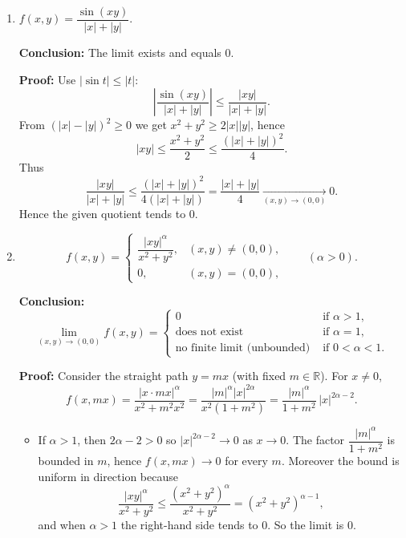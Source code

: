 \documentclass[12pt]{article}
\begin{document}
\begin{correctionbox}
\begin{enumerate}
\textbf{Conclusion:} The limit exists and equals \(0\).

\textbf{Proof:} Let \(R=\sqrt{x^2+y^2}\). Then \(|x|\le R\) and \(|y|\le R\). Also \(|xy|\le\tfrac{x^2+y^2}{2}=\tfrac{R^2}{2}\). Hence
\[
|2x^2+xy|\le 2x^2+|xy|\le 2R^2+\frac{R^2}{2}=\frac{5}{2}R^2.
\]
Therefore
\[
\left|\frac{2x^2+xy}{\sqrt{x^2+y^2}}\right|\le \frac{\tfrac{5}{2}R^2}{R}=\frac{5}{2}R,
\]
which tends to \(0\) as \((x,y)\to(0,0)\). So the limit is \(0\).

\bigskip

\item \(f(x,y)=\dfrac{\sin(xy)}{|x|+|y|}.\)

\textbf{Conclusion:} The limit exists and equals \(0\).

\textbf{Proof:} Use \(|\sin t|\le|t|\):
\[
\left|\frac{\sin(xy)}{|x|+|y|}\right|\le \frac{|xy|}{|x|+|y|}.
\]
From \((|x|-|y|)^2\ge0\) we get \(x^2+y^2\ge2|x||y|\), hence
\[
|xy|\le\frac{x^2+y^2}{2}\le\frac{(|x|+|y|)^2}{4}.
\]
Thus
\[
\frac{|xy|}{|x|+|y|}\le\frac{(|x|+|y|)^2}{4(|x|+|y|)}=\frac{|x|+|y|}{4}\xrightarrow[(x,y)\to(0,0)]{}0.
\]
Hence the given quotient tends to \(0\).

\bigskip

\item
\[
f(x,y)=\begin{cases}\dfrac{|xy|^\alpha}{x^2+y^2},&(x,y)\neq(0,0),\\[4pt]
0,&(x,y)=(0,0),
\end{cases}\qquad(\alpha>0).
\]

\textbf{Conclusion:}
\[
\lim_{(x,y)\to(0,0)} f(x,y)=
\begin{cases}
0 &\text{if }\alpha>1,\\[4pt]
\text{does not exist} &\text{if }\alpha=1,\\[4pt]
\text{no finite limit (unbounded) } &\text{if }0<\alpha<1.
\end{cases}
\]

\textbf{Proof:} Consider the straight path \(y=mx\) (with fixed \(m\in\mathbb{R}\)). For \(x\neq0\),
\[
f(x,mx)=\frac{|x\cdot mx|^\alpha}{x^2+m^2x^2}
=\frac{|m|^\alpha |x|^{2\alpha}}{x^2(1+m^2)}
=\frac{|m|^\alpha}{1+m^2}\,|x|^{2\alpha-2}.
\]
\begin{itemize}
\item If \(\alpha>1\), then \(2\alpha-2>0\) so \(|x|^{2\alpha-2}\to0\) as \(x\to0\). The factor \(\dfrac{|m|^\alpha}{1+m^2}\) is bounded in \(m\), hence \(f(x,mx)\to0\) for every \(m\). Moreover the bound is uniform in direction because
\[
\frac{|xy|^\alpha}{x^2+y^2}\le \frac{(x^2+y^2)^\alpha}{x^2+y^2}=(x^2+y^2)^{\alpha-1},
\]
and when \(\alpha>1\) the right-hand side tends to \(0\). So the limit is \(0\).


\end{itemize}
\end{enumerate}
\end{correctionbox}
\end{document}

